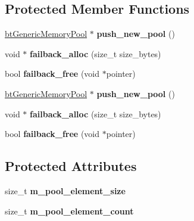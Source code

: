\subsection*{Protected Member Functions}
\begin{DoxyCompactItemize}
\item 
\mbox{\label{classbtGenericPoolAllocator_a1de453f3e3f6fffa62ff6ac46466af0b}} 
\hyperlink{classbtGenericMemoryPool}{bt\+Generic\+Memory\+Pool} $\ast$ {\bfseries push\+\_\+new\+\_\+pool} ()
\item 
\mbox{\label{classbtGenericPoolAllocator_a6c04580d308b8dd29b1e6e26eb69ac54}} 
void $\ast$ {\bfseries failback\+\_\+alloc} (size\+\_\+t size\+\_\+bytes)
\item 
\mbox{\label{classbtGenericPoolAllocator_a7a8a33e2e4350d452d468b6a42ccf233}} 
bool {\bfseries failback\+\_\+free} (void $\ast$pointer)
\item 
\mbox{\label{classbtGenericPoolAllocator_a7bdf1d4be594db43be43628d3b90dc6d}} 
\hyperlink{classbtGenericMemoryPool}{bt\+Generic\+Memory\+Pool} $\ast$ {\bfseries push\+\_\+new\+\_\+pool} ()
\item 
\mbox{\label{classbtGenericPoolAllocator_a3189f393236037bec0de49d59917e24a}} 
void $\ast$ {\bfseries failback\+\_\+alloc} (size\+\_\+t size\+\_\+bytes)
\item 
\mbox{\label{classbtGenericPoolAllocator_a7a8a33e2e4350d452d468b6a42ccf233}} 
bool {\bfseries failback\+\_\+free} (void $\ast$pointer)
\end{DoxyCompactItemize}
\subsection*{Protected Attributes}
\begin{DoxyCompactItemize}
\item 
\mbox{\label{classbtGenericPoolAllocator_afaabd371d1062a16b62f584c7e06e1d5}} 
size\+\_\+t {\bfseries m\+\_\+pool\+\_\+element\+\_\+size}
\item 
\mbox{\label{classbtGenericPoolAllocator_a03e6c8bfe59622aeb9f6744802e5e5c5}} 
size\+\_\+t {\bfseries m\+\_\+pool\+\_\+element\+\_\+count}
\end{DoxyCompactItemize}


